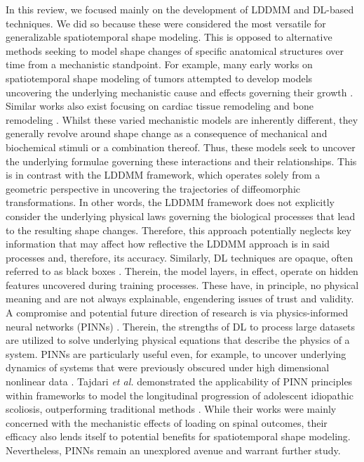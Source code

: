 	
		In this review, we focused mainly on the development of LDDMM and DL-based techniques. We did so because these were considered the most versatile for generalizable spatiotemporal shape modeling. This is opposed to alternative methods seeking to model shape changes of specific anatomical structures over time from a mechanistic standpoint. For example, many early works on spatiotemporal shape modeling of tumors attempted to develop models uncovering the underlying mechanistic cause and effects governing their growth \cite{Jarrett2018}. Similar works also exist focusing on cardiac tissue remodeling \cite{Wang2017333333} and bone remodeling \cite{Kameo2020}. Whilst these varied mechanistic models are inherently different, they generally revolve around shape change as a consequence of mechanical and biochemical stimuli or a combination thereof. Thus, these models seek to uncover the underlying formulae governing these interactions and their relationships. This is in contrast with the LDDMM framework, which operates solely from a geometric perspective in uncovering the trajectories of diffeomorphic transformations. In other words, the LDDMM framework does not explicitly consider the underlying physical laws governing the biological processes that lead to the resulting shape changes. Therefore, this approach potentially neglects key information that may affect how reflective the LDDMM approach is in said processes and, therefore, its accuracy. Similarly, DL techniques are opaque, often referred to as black boxes \cite{Castelvecchi2016}. Therein, the model layers, in effect, operate on hidden features uncovered during training processes. These have, in principle, no physical meaning and are not always explainable, engendering issues of trust and validity. A compromise and potential future direction of research is via physics-informed neural networks (PINNs) \cite{Cuomo2022}. Therein, the strengths of DL to process large datasets are utilized to solve underlying physical equations that describe the physics of a system. PINNs are particularly useful even, for example, to uncover underlying dynamics of systems that were previously obscured under high dimensional nonlinear data \cite{Lagergren2020}. Tajdari \textit{et al.} demonstrated the applicability of PINN principles within frameworks to model the longitudinal progression of adolescent idiopathic scoliosis, outperforming traditional methods \cite{Tajdari2021, Tajdari2022}. While their works were mainly concerned with the mechanistic effects of loading on spinal outcomes, their efficacy also lends itself to potential benefits for spatiotemporal shape modeling. Nevertheless, PINNs remain an unexplored avenue and warrant further study. 
		
